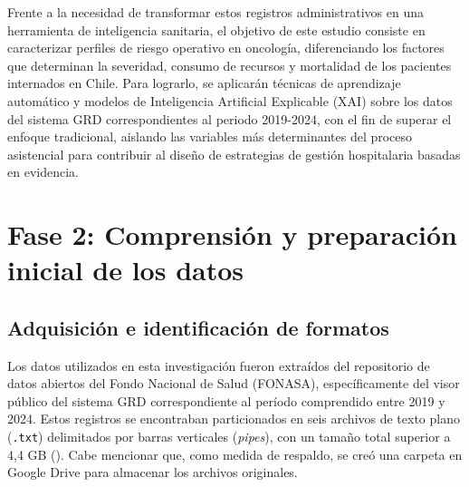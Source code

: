 Frente a la necesidad de transformar estos registros administrativos en una herramienta de inteligencia sanitaria, el objetivo de este estudio consiste en caracterizar perfiles de riesgo operativo en oncología, diferenciando los factores que determinan la severidad, consumo de recursos y mortalidad de los pacientes internados en Chile. Para lograrlo, se aplicarán técnicas de aprendizaje automático y modelos de Inteligencia Artificial Explicable (XAI) sobre los datos del sistema GRD correspondientes al periodo 2019-2024, con el fin de superar el enfoque tradicional, aislando las variables más determinantes del proceso asistencial para contribuir al diseño de estrategias de gestión hospitalaria basadas en evidencia.


\section{Fase 2: Comprensión y preparación inicial de los datos}
\label{sec:preparacion_datos}




\subsection{Adquisición e identificación de formatos}

Los datos utilizados en esta investigación fueron extraídos del repositorio de datos abiertos del Fondo Nacional de Salud (FONASA), específicamente del visor público del sistema GRD correspondiente al período comprendido entre 2019 y 2024. Estos registros se encontraban particionados en seis archivos de texto plano (\texttt{.txt}) delimitados por barras verticales (\textit{pipes}), con un tamaño total superior a 4,4 GB (\cite{fonasa_visor_grd}). Cabe mencionar que, como medida de respaldo, se creó una carpeta en Google Drive para almacenar los archivos originales.

